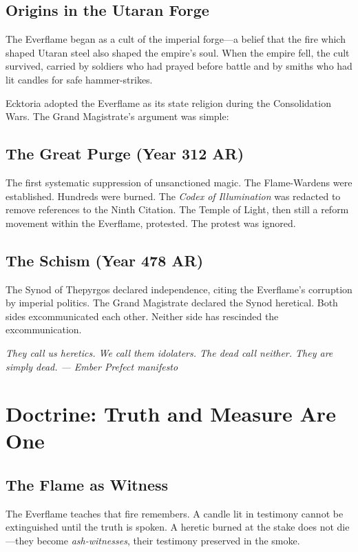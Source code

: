 \documentclass{book}
\newcommand{\citation}[1]{\textcolor{marginalia}{\small\textit{#1}}}
\begin{document}
\section{Origins in the Utaran Forge}

The Everflame began as a cult of the imperial forge---a belief that the fire which shaped Utaran steel also shaped the empire's soul. When the empire fell, the cult survived, carried by soldiers who had prayed before battle and by smiths who had lit candles for safe hammer-strikes.

Ecktoria adopted the Everflame as its state religion during the Consolidation Wars. The Grand Magistrate's argument was simple: 

\section{The Great Purge (Year 312 AR)}

The first systematic suppression of unsanctioned magic. The Flame-Wardens were established. Hundreds were burned. The \textit{Codex of Illumination} was redacted to remove references to the Ninth Citation. The Temple of Light, then still a reform movement within the Everflame, protested. The protest was ignored.

\section{The Schism (Year 478 AR)}

The Synod of Thepyrgos declared independence, citing the Everflame's corruption by imperial politics. The Grand Magistrate declared the Synod heretical. Both sides excommunicated each other. Neither side has rescinded the excommunication.

\citation{They call us heretics. We call them idolaters. The dead call neither. They are simply dead. --- Ember Prefect manifesto}

\chapter{Doctrine: Truth and Measure Are One}

\section{The Flame as Witness}

The Everflame teaches that fire remembers. A candle lit in testimony cannot be extinguished until the truth is spoken. A heretic burned at the stake does not die---they become \textit{ash-witnesses}, their testimony preserved in the smoke.
\end{document}

